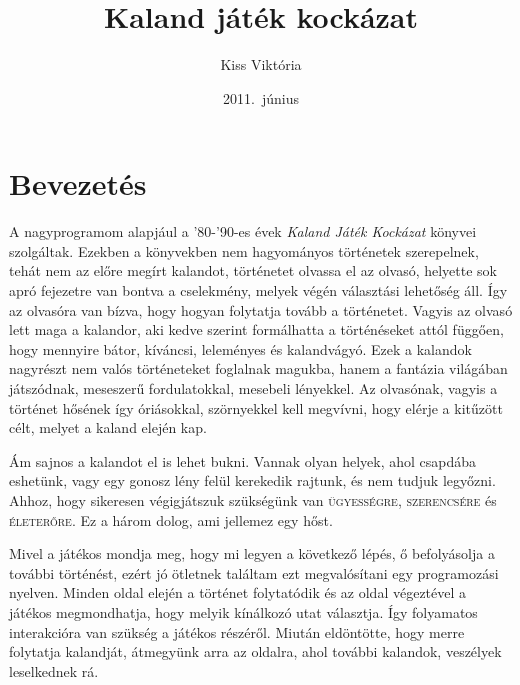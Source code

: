 \documentclass[12pt,a4paper,oneside]{report}
\begin{document}
\title{Kaland játék kockázat}
\author{Kiss Viktória}
\date{2011.\ június}

\tableofcontents

\newcommand{\chap}[1]{
  \addcontentsline{toc}{chapter}{#1}
  \addtocounter{chapter}{1}
  \chapter*{#1}
}

\chapter*{Bevezetés}
  A nagyprogramom alapjául a '80-'90-es évek \emph{Kaland Játék Kockázat}
  könyvei szolgáltak. Ezekben a könyvekben nem hagyományos történetek
  szerepelnek, tehát nem az előre megírt kalandot, történetet olvassa el
  az olvasó, helyette sok apró fejezetre van bontva a cselekmény, melyek
  végén választási lehetőség áll. Így az olvasóra van bízva, hogy hogyan
  folytatja tovább a történetet. Vagyis az olvasó lett maga a kalandor,
  aki kedve szerint formálhatta a történéseket attól függően, hogy
  mennyire bátor, kíváncsi, leleményes és kalandvágyó. Ezek a kalandok
  nagyrészt nem valós történeteket foglalnak magukba, hanem a fantázia
  világában játszódnak, meseszerű fordulatokkal, mesebeli lényekkel. Az
  olvasónak, vagyis a történet hősének így óriásokkal, szörnyekkel kell
  megvívni, hogy elérje a kitűzött célt, melyet a kaland elején kap.
  
  Ám sajnos a kalandot el is lehet bukni. Vannak olyan helyek, ahol
  csapdába eshetünk, vagy egy gonosz lény felül kerekedik rajtunk, és
  nem tudjuk legyőzni. Ahhoz, hogy sikeresen végigjátszuk szükségünk
  van \textsc{ügyességre}, \textsc{szerencsére} és
  \textsc{életerőre}. Ez a három dolog, ami jellemez egy hőst.

  Mivel a játékos mondja meg, hogy mi legyen a következő lépés, ő
  befolyásolja a további történést, ezért jó ötletnek találtam ezt
  megvalósítani egy programozási nyelven. Minden oldal elején a történet
  folytatódik és az oldal végeztével a játékos megmondhatja, hogy
  melyik kínálkozó utat választja. Így folyamatos interakcióra van
  szükség a játékos részéről. Miután eldöntötte, hogy merre folytatja
  kalandját, átmegyünk arra az oldalra, ahol további kalandok, veszélyek
  leselkednek rá.
  
\end{document}
